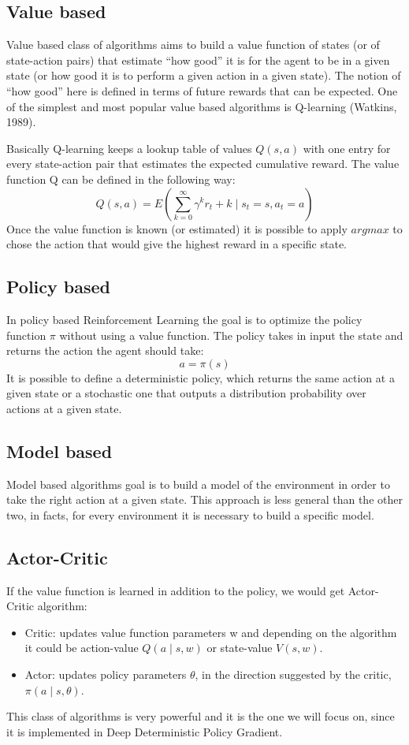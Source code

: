 \documentclass[Lau,oneside,noexaminfo]{sapthesis} %
\begin{document}
\subsection{Value based}
Value based class of algorithms aims to build a value function of states (or of state-action pairs) that estimate “how good” it is for the agent to be in a given state (or how good it is to perform a given action in a given state). The notion of “how good” here is defined in terms of future rewards that can be expected. One of the simplest and most popular value based algorithms is Q-learning (Watkins, 1989). 

Basically Q-learning keeps a lookup table of values $Q(s,a)$ with one entry for every state-action pair that estimates the  expected cumulative reward. The value function Q can be defined in the following way:
\begin{equation}
Q( s,a ) = E( \sum_{k=0}^{\infty} \gamma^k r_t+k \mid s_t=s, a_t=a )
\end{equation}
Once the value function is known (or estimated) it is possible to apply $argmax$ to chose the action that would give the highest reward in a specific state.
\subsection{Policy based}
In policy based Reinforcement Learning the goal is to optimize the policy function $\pi$ without using a value function. The policy takes in input the state and returns the action the agent should take:
\begin{equation}
a = \pi(s)
\end{equation}
It is possible to define a deterministic policy, which returns the same action at a given state or a stochastic one  that outputs a distribution probability over actions at a given state.
\subsection{Model based}
Model based algorithms goal is to build a model of the environment in order to take the right action at a given state. This approach is less general than the other two, in facts, for every environment it is necessary to build a specific model.
\subsection{Actor-Critic}
If the value function is learned in addition to the policy, we would get Actor-Critic algorithm:
\begin{itemize}
	\item Critic: updates value function parameters w and depending on the algorithm it could be action-value $Q(a\mid s,w)$ or state-value $V(s,w)$.
	\item Actor: updates policy parameters $\theta$, in the direction suggested by the critic, $\pi(a\mid s,\theta)$.
\end{itemize}
This class of algorithms is very powerful and it is the one we will focus on, since it is implemented in Deep Deterministic Policy Gradient.
\end{document}
